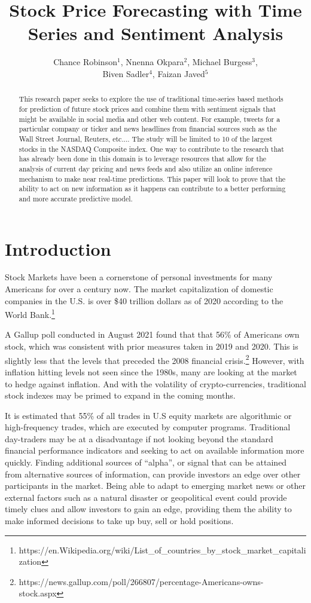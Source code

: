 \documentclass{llncs}
\title{Stock Price Forecasting with Time Series and Sentiment Analysis}
\author{Chance Robinson$^1$, Nnenna Okpara$^2$, Michael Burgess$^3$, \\ Biven Sadler$^4$, Faizan Javed$^5$}
\institute{$^1$Master of Science in Data Science \\ Southern Methodist University \\ Dallas, Texas USA \\
\{\email{chance},
\email{nokpara},
\email{mwburgess},
\email{bsadler},
\email{fjaved}\}@smu.edu}
\begin{document}
\maketitle

\begin{abstract}
This research paper seeks to explore the use of traditional time-series based methods for prediction of future stock prices and combine them with sentiment signals that might be available in social media and other web content. For example, tweets for a particular company or ticker and news headlines from financial sources such as the Wall Street Journal, Reuters, etc.... The study will be limited to 10 of the largest stocks in the NASDAQ Composite index.  One way to contribute to the research that has already been done in this domain is to leverage resources that allow for the analysis of current day pricing and news feeds and also utilize an online inference mechanism to make near real-time predictions. This paper will look to prove that the ability to act on new information as it happens can contribute to a better performing and more accurate predictive model.
\end{abstract}


\section{Introduction}

Stock Markets have been a cornerstone of personal investments for many Americans for over a century now. The market capitalization of domestic companies in the U.S. is over \$40 trillion dollars as of 2020 according to the World Bank.\footnote{https://en.Wikipedia.org/wiki/List\_of\_countries\_by\_stock\_market\_capitalization}

A Gallup poll conducted in August 2021 found that that 56\% of Americans own stock, which was consistent with prior measures taken in 2019 and 2020. This is slightly less that the levels that preceded the 2008 financial crisis.\footnote{https://news.gallup.com/poll/266807/percentage-Americans-owns-stock.aspx}  However, with inflation hitting levels not seen since the 1980s, many are looking at the market to hedge against inflation. And with the volatility of crypto-currencies, traditional stock indexes may be primed to expand in the coming months.

It is estimated that 55\% of all trades in U.S equity markets are algorithmic or high-frequency trades, which are executed by computer programs. Traditional day-traders may be at a disadvantage if not looking beyond the standard financial performance indicators and seeking to act on available information more quickly. Finding additional sources of “alpha”, or signal that can be attained from alternative sources of information, can provide investors an edge over other participants in the market. Being able to adapt to emerging market news or other external factors such as a natural disaster or geopolitical event could provide timely clues and allow investors to gain an edge, providing them the ability to make informed decisions to take up buy, sell or hold positions.
\end{document}
